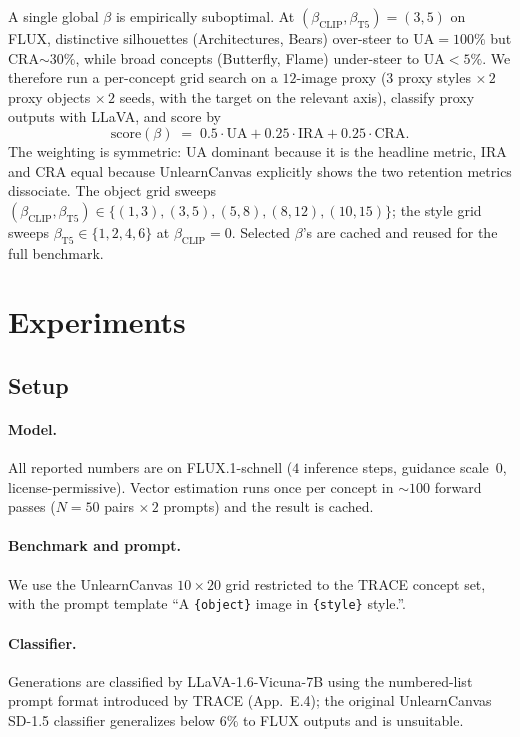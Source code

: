 \documentclass{article}
\begin{document}
A single global $\beta$ is empirically suboptimal. At
$(\beta_{\mathrm{CLIP}},\beta_{\mathrm{T5}}){=}(3,5)$ on FLUX,
distinctive silhouettes (Architectures, Bears) over-steer to
UA${=}100\%$ but CRA${\sim}30\%$, while broad concepts (Butterfly,
Flame) under-steer to UA${<}5\%$. We therefore run a per-concept
grid search on a $12$-image proxy ($3$ proxy styles
$\times\,2$ proxy objects $\times\,2$ seeds, with the target on the
relevant axis), classify proxy outputs with LLaVA, and score by
\[
\mathrm{score}(\beta) \;=\; 0.5\cdot\mathrm{UA} + 0.25\cdot\mathrm{IRA} + 0.25\cdot\mathrm{CRA}.
\]
The weighting is symmetric: UA dominant because it is the headline
metric, IRA and CRA equal because UnlearnCanvas explicitly shows the
two retention metrics dissociate. The object grid sweeps
$(\beta_{\mathrm{CLIP}},\beta_{\mathrm{T5}})\!\in\!
\{(1{,}3),(3{,}5),(5{,}8),(8{,}12),(10{,}15)\}$; the style grid
sweeps $\beta_{\mathrm{T5}}\!\in\!\{1,2,4,6\}$ at
$\beta_{\mathrm{CLIP}}{=}0$. Selected $\beta$'s are cached and
reused for the full benchmark.

\section{Experiments}
\label{sec:exp}

\subsection{Setup}
\label{sec:exp_setup}

\paragraph{Model.} All reported numbers are on FLUX.1-schnell
($4$ inference steps, guidance scale~$0$, license-permissive). Vector
estimation runs once per concept in ${\sim}100$ forward passes
($N{=}50$ pairs $\times\,2$ prompts) and the result is cached.

\paragraph{Benchmark and prompt.} We use the UnlearnCanvas
$10\!\times\!20$ grid restricted to the TRACE concept set, with the
prompt template ``A \texttt{\{object\}} image in
\texttt{\{style\}} style.''.

\paragraph{Classifier.} Generations are classified by
LLaVA-1.6-Vicuna-7B using the numbered-list prompt format introduced
by TRACE (App.~E.4); the original UnlearnCanvas SD-1.5 classifier
generalizes below $6\%$ to FLUX outputs and is unsuitable.
\end{document}
